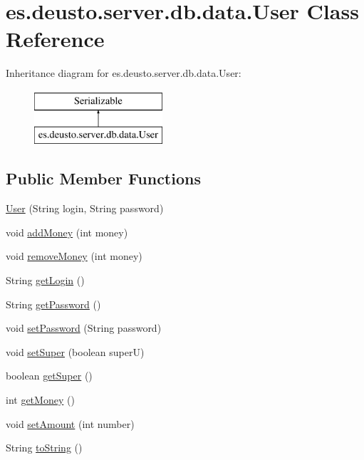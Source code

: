 \hypertarget{classes_1_1deusto_1_1server_1_1db_1_1data_1_1_user}{}\section{es.\+deusto.\+server.\+db.\+data.\+User Class Reference}
\label{classes_1_1deusto_1_1server_1_1db_1_1data_1_1_user}
Inheritance diagram for es.\+deusto.\+server.\+db.\+data.\+User\+:\begin{figure}[H]
\begin{center}
\leavevmode
\includegraphics[height=2.000000cm]{classes_1_1deusto_1_1server_1_1db_1_1data_1_1_user}
\end{center}
\end{figure}
\subsection*{Public Member Functions}
\begin{DoxyCompactItemize}
\item 
\hyperlink{classes_1_1deusto_1_1server_1_1db_1_1data_1_1_user_accf4cd75adc5bfc6cd376a1714517ba9}{User} (String login, String password)
\item 
void \hyperlink{classes_1_1deusto_1_1server_1_1db_1_1data_1_1_user_a0fbb3860281941edb6832d0424910cd7}{add\+Money} (int money)
\item 
void \hyperlink{classes_1_1deusto_1_1server_1_1db_1_1data_1_1_user_a9de251663e6c2ecfdc5dcdac19224a1e}{remove\+Money} (int money)
\item 
String \hyperlink{classes_1_1deusto_1_1server_1_1db_1_1data_1_1_user_a2bc07e76806b027ef70b5ad8cea5f9fa}{get\+Login} ()
\item 
String \hyperlink{classes_1_1deusto_1_1server_1_1db_1_1data_1_1_user_ac576607b3eae9e9b8c7002d5cd7c1a62}{get\+Password} ()
\item 
void \hyperlink{classes_1_1deusto_1_1server_1_1db_1_1data_1_1_user_a0098f77da63338c8374ea1e5baab28c9}{set\+Password} (String password)
\item 
void \hyperlink{classes_1_1deusto_1_1server_1_1db_1_1data_1_1_user_a0e2c3f3fea559e9ab7eaab197fe9e015}{set\+Super} (boolean superU)
\item 
boolean \hyperlink{classes_1_1deusto_1_1server_1_1db_1_1data_1_1_user_a9f13d80d62b561e4fc76286cccf3333a}{get\+Super} ()
\item 
int \hyperlink{classes_1_1deusto_1_1server_1_1db_1_1data_1_1_user_a685ffb55326ae540eeb26eff13685a76}{get\+Money} ()
\item 
void \hyperlink{classes_1_1deusto_1_1server_1_1db_1_1data_1_1_user_af4381bf3a6dedebc28c50812cb71599a}{set\+Amount} (int number)
\item 
String \hyperlink{classes_1_1deusto_1_1server_1_1db_1_1data_1_1_user_a494980951c4c71c0a793994b7bcd5101}{to\+String} ()
\end{DoxyCompactItemize}


